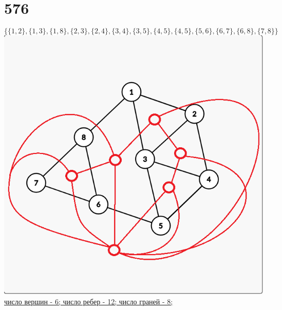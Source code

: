 \documentclass[a4paper, 12pt]{article}
\begin{document}
\section*{576}
\[
       \{\{1,2\},\{1,3\},\{1,8\},\{2,3\},\{2,4\},\{3,4\},\{3,5\},\{4,5\},\{4,5\},\{5,6\}
       ,\{6,7\},\{6,8\},\{7,8\}\}
\]
\includegraphics{576.png}\\
\underline{число вершин - 6; число ребер - 12; число граней - 8;}
\end{document}
